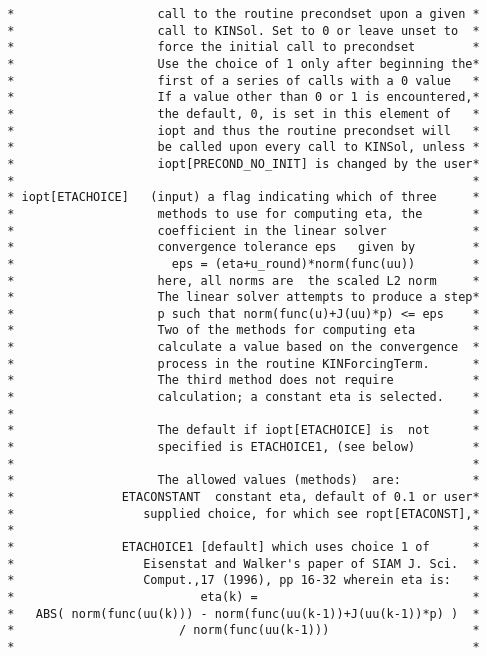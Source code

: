 \begin{verbatim}
 *                    call to the routine precondset upon a given *
 *                    call to KINSol. Set to 0 or leave unset to  *
 *                    force the initial call to precondset        *
 *                    Use the choice of 1 only after beginning the*
 *                    first of a series of calls with a 0 value   *
 *                    If a value other than 0 or 1 is encountered,*
 *                    the default, 0, is set in this element of   *
 *                    iopt and thus the routine precondset will   *
 *                    be called upon every call to KINSol, unless *
 *                    iopt[PRECOND_NO_INIT] is changed by the user*
 *                                                                *
 * iopt[ETACHOICE]   (input) a flag indicating which of three     *
 *                    methods to use for computing eta, the       *
 *                    coefficient in the linear solver            *
 *                    convergence tolerance eps   given by        *
 *                      eps = (eta+u_round)*norm(func(uu))        *
 *                    here, all norms are  the scaled L2 norm     *
 *                    The linear solver attempts to produce a step*
 *                    p such that norm(func(u)+J(uu)*p) <= eps    *
 *                    Two of the methods for computing eta        *
 *                    calculate a value based on the convergence  *
 *                    process in the routine KINForcingTerm.      *
 *                    The third method does not require           *
 *                    calculation; a constant eta is selected.    *
 *                                                                *
 *                    The default if iopt[ETACHOICE] is  not      *
 *                    specified is ETACHOICE1, (see below)        *
 *                                                                *
 *                    The allowed values (methods)  are:          *
 *               ETACONSTANT  constant eta, default of 0.1 or user*
 *                  supplied choice, for which see ropt[ETACONST],*
 *                                                                *
 *               ETACHOICE1 [default] which uses choice 1 of      *
 *                  Eisenstat and Walker's paper of SIAM J. Sci.  *
 *                  Comput.,17 (1996), pp 16-32 wherein eta is:   *
 *                          eta(k) =                              *
 *   ABS( norm(func(uu(k))) - norm(func(uu(k-1))+J(uu(k-1))*p) )  *
 *                       / norm(func(uu(k-1)))                    *
 *                                                                *

\end{verbatim}
